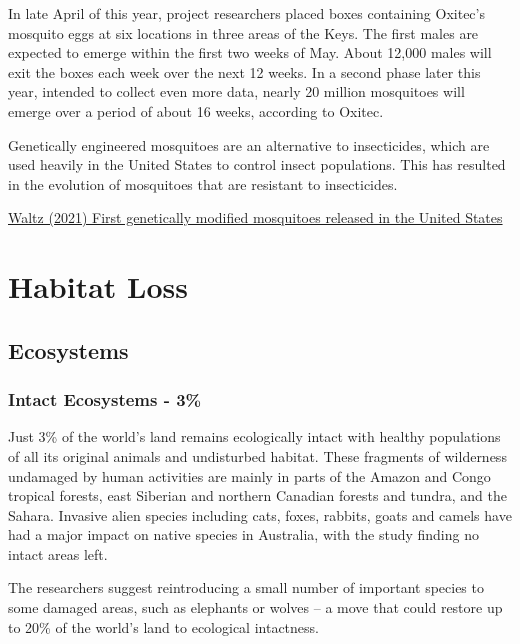 \documentclass[
]{book}
\begin{document}
In late April of this year, project researchers placed boxes containing Oxitec's mosquito eggs at six locations in three areas of the Keys. The first males are expected to emerge within the first two weeks of May. About 12,000 males will exit the boxes each week over the next 12 weeks. In a second phase later this year, intended to collect even more data, nearly 20 million mosquitoes will emerge over a period of about 16 weeks, according to Oxitec.

Genetically engineered mosquitoes are an alternative to insecticides, which are used heavily in the United States to control insect populations. This has resulted in the evolution of mosquitoes that are resistant to insecticides.

\href{https://www.nature.com/articles/d41586-021-01186-6?utm_source=twitter\&utm_medium=social\&utm_content=organic\&utm_campaign=NGMT_USG_JC01_GL_Nature}{Waltz (2021) First genetically modified mosquitoes released in the United States}

\hypertarget{habitat-loss}{%
\chapter{Habitat Loss}\label{habitat-loss}}

\hypertarget{ecosystems}{%
\section{Ecosystems}\label{ecosystems}}

\hypertarget{intact-ecosystems---3}{%
\subsection{Intact Ecosystems - 3\%}\label{intact-ecosystems---3}}

Just 3\% of the world's land remains ecologically intact with healthy populations of all its original animals and undisturbed habitat.
These fragments of wilderness undamaged by human activities are mainly in parts of the Amazon and Congo tropical forests, east Siberian and northern Canadian forests and tundra, and the Sahara. Invasive alien species including cats, foxes, rabbits, goats and camels have had a major impact on native species in Australia, with the study finding no intact areas left.

The researchers suggest reintroducing a small number of important species to some damaged areas, such as elephants or wolves -- a move that could restore up to 20\% of the world's land to ecological intactness.
\end{document}
